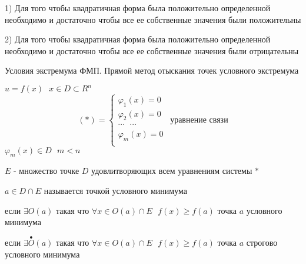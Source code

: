 \begin{block}
  1) Для того чтобы квадратичная форма была положительно определенной
  необходимо и достаточно чтобы все ее собственные значения были положительны

  2) Для того чтобы квадратичная форма была положительно определенной
  необходимо и достаточно чтобы все ее собственные значения были отрицательны
\end{block}

\begin{title}[\Large]
  Условия экстремума ФМП. Прямой метод отыскания точек условного экстремума
\end{title}

\begin{define}
  $u = f(x) ~~~ x \in D \subset R^n$
  $$
  (*) =
  \left\{
  \begin{array}{c}
    \varphi_1(x) = 0 \\
    \varphi_2(x) = 0 \\
    \cdots ~~~ \cdots \\
    \varphi_m(x) = 0 \\
  \end{array}
  \right. ~~ \text{уравнение связи}
  $$
  $\varphi_m(x) \in D ~~~ m < n$

  $E$ - множество точке $D$ удовлитворяющих всем уравнениям системы $*$

  $a \in D \cap E$ называется точкой условного минимума

  если $\exists O(a)$ такая что $\forall x \in O(a) \cap E ~~~ f(x) \ge f(a)$
  точка $a$ условного минимума

  если $\exists \stackrel{\bullet}{O}(a)$ такая что $\forall x \in O(a) \cap E
  ~~~ f(x) \ge f(a)$ точка $a$ строгово условного минимума
\end{define}